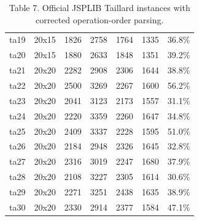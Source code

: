 \documentclass{article}
\begin{document}
\begin{table}[h]
\begin{tabular}{lllllll}
ta19 & 20x15 & 1826 & 2758 & 1764 & 1335 & 36.8\% \\
ta20 & 20x15 & 1880 & 2633 & 1848 & 1351 & 39.2\% \\
ta21 & 20x20 & 2282 & 2908 & 2306 & 1644 & 38.8\% \\
ta22 & 20x20 & 2500 & 3269 & 2267 & 1600 & 56.2\% \\
ta23 & 20x20 & 2041 & 3123 & 2173 & 1557 & 31.1\% \\
ta24 & 20x20 & 2220 & 3359 & 2260 & 1647 & 34.8\% \\
ta25 & 20x20 & 2409 & 3337 & 2228 & 1595 & 51.0\% \\
ta26 & 20x20 & 2184 & 2948 & 2326 & 1645 & 32.8\% \\
ta27 & 20x20 & 2316 & 3019 & 2247 & 1680 & 37.9\% \\
ta28 & 20x20 & 2108 & 3227 & 2305 & 1614 & 30.6\% \\
ta29 & 20x20 & 2271 & 3251 & 2438 & 1635 & 38.9\% \\
ta30 & 20x20 & 2330 & 2914 & 2377 & 1584 & 47.1\% \\
\bottomrule
\end{tabular}
\caption{Table 7. Official JSPLIB Taillard instances with corrected operation-order parsing.}
\end{table}
\end{document}
